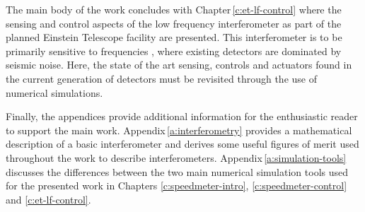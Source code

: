 The main body of the work concludes with Chapter\,\ref{c:et-lf-control} where the sensing and control aspects of the low frequency interferometer as part of the planned Einstein Telescope facility are presented. This interferometer is to be primarily sensitive to frequencies , where existing detectors are dominated by seismic noise. Here, the state of the art sensing, controls and actuators found in the current generation of detectors must be revisited through the use of numerical simulations.

Finally, the appendices provide additional information for the enthusiastic reader to support the main work. Appendix\,\ref{a:interferometry} provides a mathematical description of a basic interferometer and derives some useful figures of merit used throughout the work to describe interferometers. Appendix\,\ref{a:simulation-tools} discusses the differences between the two main numerical simulation tools used for the presented work in Chapters \ref{c:speedmeter-intro}, \ref{c:speedmeter-control} and \ref{c:et-lf-control}.
